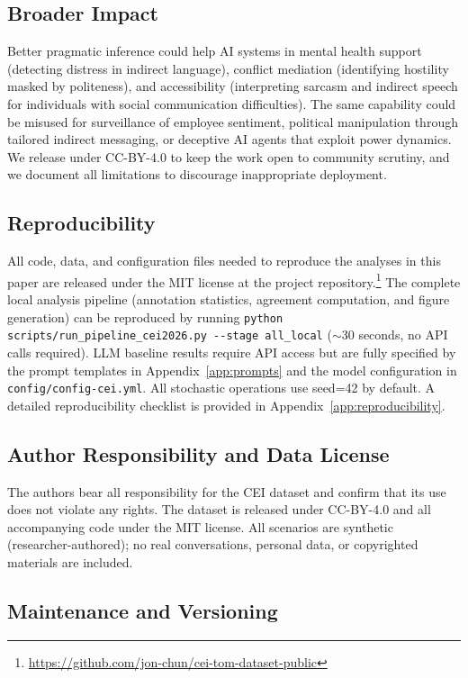 \documentclass[twoside,11pt]{article}
\begin{document}
\subsection{Broader Impact}

Better pragmatic inference could help AI systems in mental health support (detecting distress in indirect language), conflict mediation (identifying hostility masked by politeness), and accessibility (interpreting sarcasm and indirect speech for individuals with social communication difficulties). The same capability could be misused for surveillance of employee sentiment, political manipulation through tailored indirect messaging, or deceptive AI agents that exploit power dynamics. We release under CC-BY-4.0 to keep the work open to community scrutiny, and we document all limitations to discourage inappropriate deployment.

\subsection{Reproducibility}

All code, data, and configuration files needed to reproduce the analyses in this paper are released under the MIT license at the project repository.\footnote{\url{https://github.com/jon-chun/cei-tom-dataset-public}} The complete local analysis pipeline (annotation statistics, agreement computation, and figure generation) can be reproduced by running \texttt{python scripts/run\_pipeline\_cei2026.py -{}-stage all\_local} ($\sim$30 seconds, no API calls required). LLM baseline results require API access but are fully specified by the prompt templates in Appendix~\ref{app:prompts} and the model configuration in \texttt{config/config-cei.yml}. All stochastic operations use seed=42 by default. A detailed reproducibility checklist is provided in Appendix~\ref{app:reproducibility}.

\subsection{Author Responsibility and Data License}

The authors bear all responsibility for the CEI dataset and confirm that its use does not violate any rights. The dataset is released under CC-BY-4.0 and all accompanying code under the MIT license. All scenarios are synthetic (researcher-authored); no real conversations, personal data, or copyrighted materials are included.

\subsection{Maintenance and Versioning}
\end{document}
